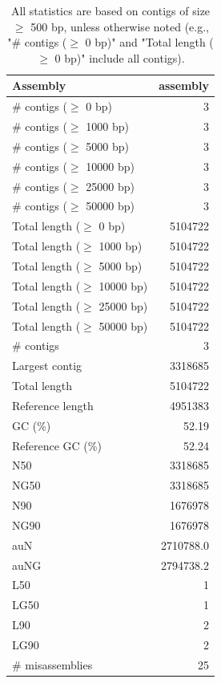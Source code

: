 \documentclass[12pt,a4paper]{article}
\begin{document}
\begin{table}[ht]
\begin{center}
\caption{All statistics are based on contigs of size $\geq$ 500 bp, unless otherwise noted (e.g., "\# contigs ($\geq$ 0 bp)" and "Total length ($\geq$ 0 bp)" include all contigs).}
\begin{tabular}{|l*{1}{|r}|}
\hline
Assembly & assembly \\ \hline
\# contigs ($\geq$ 0 bp) & 3 \\ \hline
\# contigs ($\geq$ 1000 bp) & 3 \\ \hline
\# contigs ($\geq$ 5000 bp) & 3 \\ \hline
\# contigs ($\geq$ 10000 bp) & 3 \\ \hline
\# contigs ($\geq$ 25000 bp) & 3 \\ \hline
\# contigs ($\geq$ 50000 bp) & 3 \\ \hline
Total length ($\geq$ 0 bp) & 5104722 \\ \hline
Total length ($\geq$ 1000 bp) & 5104722 \\ \hline
Total length ($\geq$ 5000 bp) & 5104722 \\ \hline
Total length ($\geq$ 10000 bp) & 5104722 \\ \hline
Total length ($\geq$ 25000 bp) & 5104722 \\ \hline
Total length ($\geq$ 50000 bp) & 5104722 \\ \hline
\# contigs & 3 \\ \hline
Largest contig & 3318685 \\ \hline
Total length & 5104722 \\ \hline
Reference length & 4951383 \\ \hline
GC (\%) & 52.19 \\ \hline
Reference GC (\%) & 52.24 \\ \hline
N50 & 3318685 \\ \hline
NG50 & 3318685 \\ \hline
N90 & 1676978 \\ \hline
NG90 & 1676978 \\ \hline
auN & 2710788.0 \\ \hline
auNG & 2794738.2 \\ \hline
L50 & 1 \\ \hline
LG50 & 1 \\ \hline
L90 & 2 \\ \hline
LG90 & 2 \\ \hline
\# misassemblies & 25 \\ \hline

\end{tabular}
\end{center}
\end{table}
\end{document}
